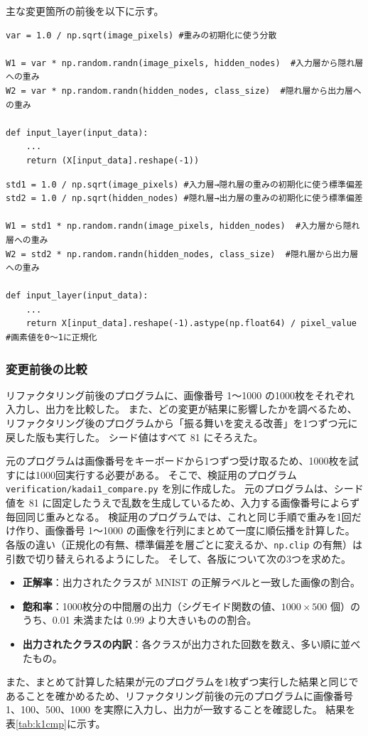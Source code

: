 \documentclass[a4paper,11pt]{ltjsarticle}
\begin{document}
主な変更箇所の前後を以下に示す。

\begin{lstlisting}[style=before, caption={【前】重みの初期化と入力の前処理}, label=lst:k1b]
var = 1.0 / np.sqrt(image_pixels) #重みの初期化に使う分散

W1 = var * np.random.randn(image_pixels, hidden_nodes)  #入力層から隠れ層への重み
W2 = var * np.random.randn(hidden_nodes, class_size)  #隠れ層から出力層への重み

def input_layer(input_data):
    ...
    return (X[input_data].reshape(-1))
\end{lstlisting}

\begin{lstlisting}[style=after, caption={【後】重みの初期化と入力の前処理}, label=lst:k1a]
std1 = 1.0 / np.sqrt(image_pixels) #入力層→隠れ層の重みの初期化に使う標準偏差
std2 = 1.0 / np.sqrt(hidden_nodes) #隠れ層→出力層の重みの初期化に使う標準偏差

W1 = std1 * np.random.randn(image_pixels, hidden_nodes)  #入力層から隠れ層への重み
W2 = std2 * np.random.randn(hidden_nodes, class_size)  #隠れ層から出力層への重み

def input_layer(input_data):
    ...
    return X[input_data].reshape(-1).astype(np.float64) / pixel_value #画素値を0〜1に正規化
\end{lstlisting}

\subsubsection{変更前後の比較}
\label{sec:k1cmp}
リファクタリング前後のプログラムに、画像番号 1～1000 の1000枚をそれぞれ入力し、出力を比較した。
また、どの変更が結果に影響したかを調べるため、リファクタリング後のプログラムから「振る舞いを変える改善」を1つずつ元に戻した版も実行した。
シード値はすべて 81 にそろえた。

元のプログラムは画像番号をキーボードから1つずつ受け取るため、1000枚を試すには1000回実行する必要がある。
そこで、検証用のプログラム \texttt{verification/kadai1\_compare.py} を別に作成した。
元のプログラムは、シード値を 81 に固定したうえで乱数を生成しているため、入力する画像番号によらず毎回同じ重みとなる。
検証用のプログラムでは、これと同じ手順で重みを1回だけ作り、画像番号 1～1000 の画像を行列にまとめて一度に順伝播を計算した。
各版の違い（正規化の有無、標準偏差を層ごとに変えるか、\texttt{np.clip} の有無）は引数で切り替えられるようにした。
そして、各版について次の3つを求めた。
\begin{itemize}
  \item \textbf{正解率}：出力されたクラスが MNIST の正解ラベルと一致した画像の割合。
  \item \textbf{飽和率}：1000枚分の中間層の出力（シグモイド関数の値、$1000 \times 500$ 個）のうち、0.01 未満または 0.99 より大きいものの割合。
  \item \textbf{出力されたクラスの内訳}：各クラスが出力された回数を数え、多い順に並べたもの。
\end{itemize}
また、まとめて計算した結果が元のプログラムを1枚ずつ実行した結果と同じであることを確かめるため、リファクタリング前後の元のプログラムに画像番号 1、100、500、1000 を実際に入力し、出力が一致することを確認した。
結果を表\ref{tab:k1cmp}に示す。
\end{document}
